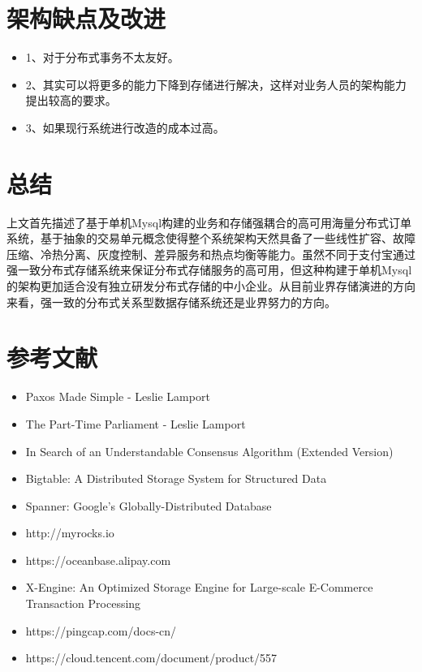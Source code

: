 \documentclass[letterpaper,twocolumn,10pt]{article}
\begin{document}
\section{架构缺点及改进}
\begin{itemize}
\item 1、对于分布式事务不太友好。
\item 2、其实可以将更多的能力下降到存储进行解决，这样对业务人员的架构能力提出较高的要求。
\item 3、如果现行系统进行改造的成本过高。
\end{itemize}

\section{总结}
上文首先描述了基于单机Mysql构建的业务和存储强耦合的高可用海量分布式订单系统，基于抽象的交易单元概念使得整个系统架构天然具备了一些线性扩容、故障压缩、冷热分离、灰度控制、差异服务和热点均衡等能力。虽然不同于支付宝通过强一致分布式存储系统来保证分布式存储服务的高可用，但这种构建于单机Mysql的架构更加适合没有独立研发分布式存储的中小企业。从目前业界存储演进的方向来看，强一致的分布式关系型数据存储系统还是业界努力的方向。

\section*{参考文献}

\begin{itemize}
\item Paxos Made Simple - Leslie Lamport
\item The Part-Time Parliament - Leslie Lamport
\item In Search of an Understandable Consensus Algorithm (Extended Version)
\item Bigtable: A Distributed Storage System for Structured Data
\item Spanner: Google’s Globally-Distributed Database
\item http://myrocks.io
\item https://oceanbase.alipay.com
\item X-Engine: An Optimized Storage Engine for Large-scale E-Commerce Transaction Processing
\item https://pingcap.com/docs-cn/
\item https://cloud.tencent.com/document/product/557
\end{itemize}
\end{document}
